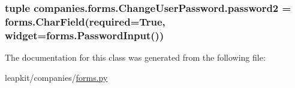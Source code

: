 \hypertarget{classcompanies_1_1forms_1_1_change_user_password_addbf436e109e74129b9dda3b4f9fd356}{
\subsubsection[{password2}]{\setlength{\rightskip}{0pt plus 5cm}tuple companies.\-forms.\-Change\-User\-Password.\-password2 = forms.\-Char\-Field(required=True, {\bf widget}=forms.\-Password\-Input())\hspace{0.3cm}{\ttfamily [static]}}}\label{classcompanies_1_1forms_1_1_change_user_password_addbf436e109e74129b9dda3b4f9fd356}


The documentation for this class was generated from the following file\-:\begin{DoxyCompactItemize}
\item 
leapkit/companies/\hyperlink{companies_2forms_8py}{forms.\-py}\end{DoxyCompactItemize}
